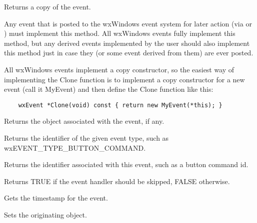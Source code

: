 
Returns a copy of the event.

Any event that is posted to the wxWindows event system for later action (via
 or
) must implement this method. All wxWindows
events fully implement this method, but any derived events implemented by the
user should also implement this method just in case they (or some event
derived from them) are ever posted.

All wxWindows events implement a copy constructor, so the easiest way of
implementing the Clone function is to implement a copy constructor for
a new event (call it MyEvent) and then define the Clone function like this:
\begin{verbatim}
    wxEvent *Clone(void) const { return new MyEvent(*this); }
\end{verbatim}



Returns the object associated with the
event, if any.



Returns the identifier of the given event type,
such as wxEVENT\_TYPE\_BUTTON\_COMMAND.



Returns the identifier associated with this event, such as a button command id.



Returns TRUE if the event handler should be skipped, FALSE otherwise.



Gets the timestamp for the event.



Sets the originating object.


